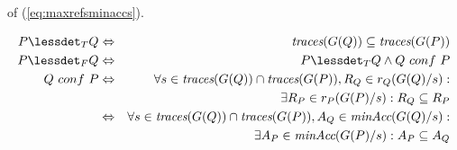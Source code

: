 of (\ref{eq:maxrefsminaccs}).
%
\begin{lemma}
  \label{lemma:tgtrcref}
  \begin{eqnarray}
  P \lessdet_T Q & \Leftrightarrow & \trc(G(Q)) \subseteq\trc(G(P))
  \label{eq:trcrefa}
  \\
  \label{eq:failconf}
  P \lessdet_F Q & \Leftrightarrow & P \lessdet_T Q \wedge Q\ conf\ P
  \\
  \label{eq:failrefa}
  Q\ conf\ P & \Leftrightarrow & \nonumber
  \forall s\in\trc(G(Q))\cap \trc(G(P)), R_Q\in r_Q(G(Q)/s):  \nonumber
  \\ & & \tabd
  \exists R_P\in r_P(G(P)/s): R_Q\subseteq R_P
  \\
  \label{eq:failrefb}
   & \Leftrightarrow &
    \forall s\in\trc(G(Q))\cap \trc(G(P)), A_Q\in\minaccs(G(Q)/s):  \nonumber
   \\ & & \tabd
  \exists A_P\in\minaccs(G(P)/s): A_P\subseteq A_Q
 \end{eqnarray}
  \xbox
\end{lemma}
%
